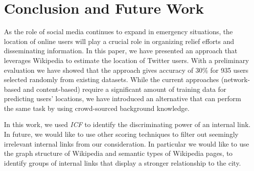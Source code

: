 \section{Conclusion and Future Work}
\label{sec:conclusion}

As the role of social media continues to expand in emergency situations, the location of online users will play a crucial role in organizing relief efforts and disseminating information. In this paper, we have presented an approach that leverages Wikipedia to estimate the location of Twitter users. With a preliminary evaluation we have showed that the approach gives accuracy of 30\% for 935 users selected randomly from existing datasets. While the current approaches (network-based and content-based) require a significant amount of training data for predicting users' locations, we have introduced an alternative that can perform the same task by using crowd-sourced background knowledge. 

In this work, we used \textit{ICF} to identify the discriminating power of an internal link. In future, we would like to use other scoring techniques to filter out seemingly irrelevant internal links from our consideration. In particular we would like to use the graph structure of Wikipedia and semantic types of Wikipedia pages, to identify groups of internal links that display a stronger relationship to the city.

 

